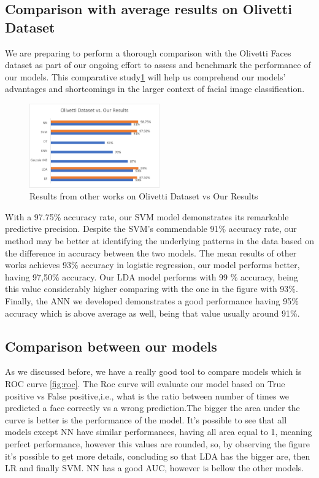 \documentclass[12pt,a4paper,twocolumn]{article}
\begin{document}
\subsection{Comparison with average results on Olivetti Dataset}
We are preparing to perform a thorough comparison with the Olivetti Faces dataset as part of our ongoing effort to assess and benchmark the performance of our models. This comparative study\ref{fig:resultC} will help us comprehend our models' advantages and shortcomings in the larger context of facial image classification.
\begin{figure}[H]
\centering
\includegraphics[width=0.5\textwidth]{images2/results.png}

\caption{\label{fig:resultC} Results from other works on Olivetti Dataset vs Our Results}
\end{figure}



With a 97.75\% accuracy rate, our SVM model demonstrates its remarkable predictive precision. Despite the SVM's commendable 91\% accuracy rate, our method may be better at identifying the underlying patterns in the data based on the difference in accuracy between the two models.
The mean results of other works achieves 93\% accuracy in logistic regression, our model performs better, having  97,50\% accuracy.
Our LDA model performs with  99 \% accuracy, being this value considerably higher comparing with the one in the figure with 93\%.
Finally, the ANN  we developed  demonstrates a good performance having 95\% accuracy which is above average as well, being that value usually around  91\%.
\subsection{Comparison between our models}
\par As we discussed before, we have a really good tool to compare models which is ROC curve \ref{fig:roc}. The Roc curve will evaluate our model based on True positive vs False positive,i.e., what is the ratio between number of times we predicted a face correctly vs a wrong prediction.The bigger the area under the curve is better is the performance of the model. It's possible to see that all models except NN have similar performances, having all area equal to 1, meaning perfect performance, however this values are rounded, so, by observing the figure it's possible to get more details, concluding so that LDA has the bigger are, then LR and finally SVM. NN has a good AUC, however is bellow the other models.
\end{document}

